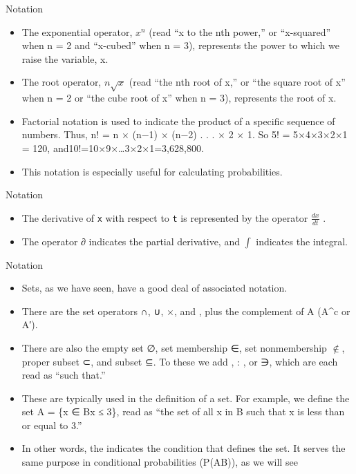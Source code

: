 \documentclass[
  ignorenonframetext,
]{beamer}
\begin{document}
\begin{frame}{Notation}
\protect\hypertarget{notation-1}{}

\begin{itemize}
\item
  The exponential operator, \(x^{n}\) (read ``x to the nth power,'' or
  ``x-squared'' when n = 2 and ``x-cubed'' when n = 3), represents the
  power to which we raise the variable, x.
\item
  The root operator, \(n\sqrt{x}\) (read ``the nth root of x,'' or ``the
  square root of x'' when n = 2 or ``the cube root of x'' when n = 3),
  represents the root of x.
\item
  Factorial notation is used to indicate the product of a specific
  sequence of numbers. Thus, n! = n × (n−1) × (n−2) . . . × 2 × 1. So 5!
  = 5×4×3×2×1 = 120, and10!=10×9×\ldots3×2×1=3,628,800.
\item
  This notation is especially useful for calculating probabilities.
\end{itemize}

\end{frame}

\begin{frame}[fragile]{Notation}
\protect\hypertarget{notation-2}{}

\begin{itemize}
\item
  The derivative of \texttt{x} with respect to \texttt{t} is represented
  by the operator \(\frac{dx}{ dt}\) .
\item
  The operator ∂ indicates the partial derivative, and \(\int\)
  indicates the integral.
\end{itemize}

\end{frame}

\begin{frame}{Notation}
\protect\hypertarget{notation-3}{}

\begin{itemize}
\item
  Sets, as we have seen, have a good deal of associated notation.
\item
  There are the set operators ∩, ∪, ×, and , plus the complement of A
  (A\^{}c or A′).
\item
  There are also the empty set ∅, set membership ∈, set nonmembership
  \(\notin\), proper subset ⊂, and subset ⊆. To these we add \textbar{}
  , : , or ∋, which are each read as ``such that.''
\item
  These are typically used in the definition of a set. For example, we
  define the set A = \{x ∈ B\textbar x ≤ 3\}, read as ``the set of all x
  in B such that x is less than or equal to 3.''
\item
  In other words, the \textbar{} indicates the condition that defines
  the set. It serves the same purpose in conditional probabilities
  (P(A\textbar B)), as we will see
\end{itemize}

\end{frame}
\end{document}
